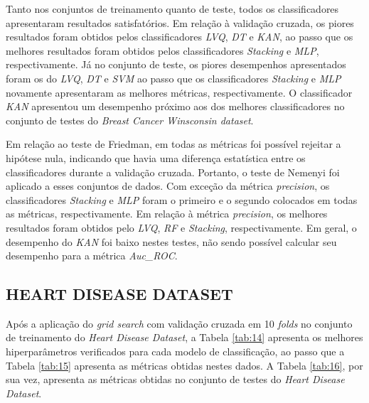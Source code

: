 \documentclass[journal]{IEEEtran}
\begin{document}
Tanto nos conjuntos de treinamento quanto de teste, todos os classificadores apresentaram resultados satisfatórios. Em relação à validação cruzada, os piores resultados foram obtidos pelos classificadores \textit{LVQ}, \textit{DT} e \textit{KAN}, ao passo que os melhores resultados foram obtidos pelos classificadores \textit{Stacking} e \textit{MLP}, respectivamente. Já no conjunto de teste, os piores desempenhos apresentados foram os do \textit{LVQ}, \textit{DT} e \textit{SVM} ao passo que os classificadores \textit{Stacking} e \textit{MLP} novamente apresentaram as melhores métricas, respectivamente. O classificador \textit{KAN} apresentou um desempenho próximo aos dos melhores classificadores no conjunto de testes do \textit{Breast Cancer Winsconsin dataset}.

Em relação ao teste de Friedman, em todas as métricas foi possível rejeitar a hipótese nula, indicando que havia uma diferença estatística entre os classificadores durante a validação cruzada. Portanto, o teste de Nemenyi foi aplicado a esses conjuntos de dados. Com exceção da métrica \textit{precision}, os classificadores \textit{Stacking} e \textit{MLP} foram o primeiro e o segundo colocados em todas as métricas, respectivamente. Em relação à métrica \textit{precision}, os melhores resultados foram obtidos pelo \textit{LVQ}, \textit{RF} e \textit{Stacking}, respectivamente. Em geral, o desempenho do \textit{KAN} foi baixo nestes testes, não sendo possível calcular seu desempenho para a métrica \textit{Auc\_ROC}.

\subsection{HEART DISEASE DATASET}

Após a aplicação do \textit{grid search} com validação cruzada em 10 \textit{folds} no conjunto de treinamento do \textit{Heart Disease Dataset}, a Tabela \ref{tab:14} apresenta os melhores hiperparâmetros verificados para cada modelo de classificação, ao passo que a Tabela \ref{tab:15} apresenta as métricas obtidas nestes dados. A Tabela \ref{tab:16}, por sua vez, apresenta as métricas obtidas no conjunto de testes do \textit{Heart Disease Dataset}.
\end{document}
